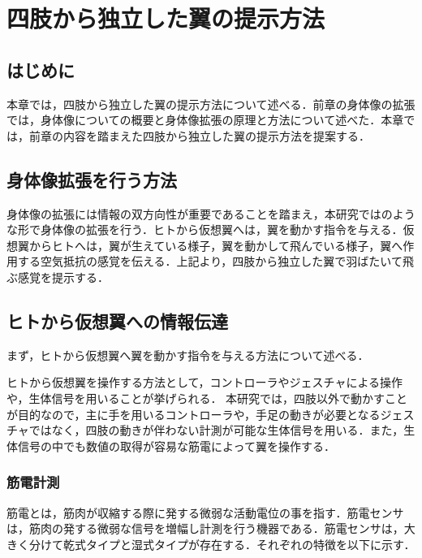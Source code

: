 \chapter[四肢から独立した翼の提示方法]%
        {四肢から独立した翼の提示方法}

\section{はじめに}
    本章では，四肢から独立した翼の提示方法について述べる．前章の身体像の拡張では，身体像についての概要と身体像拡張の原理と方法について述べた．本章では，前章の内容を踏まえた四肢から独立した翼の提示方法を提案する．


\section{身体像拡張を行う方法}
    身体像の拡張には情報の双方向性が重要であることを踏まえ，本研究ではのような形で身体像の拡張を行う．ヒトから仮想翼へは，翼を動かす指令を与える．仮想翼からヒトへは，翼が生えている様子，翼を動かして飛んでいる様子，翼へ作用する空気抵抗の感覚を伝える．上記より，四肢から独立した翼で羽ばたいて飛ぶ感覚を提示する．
    
\section{ヒトから仮想翼への情報伝達}
    まず，ヒトから仮想翼へ翼を動かす指令を与える方法について述べる．

    ヒトから仮想翼を操作する方法として，コントローラやジェスチャによる操作や，生体信号を用いることが挙げられる．
    本研究では，四肢以外で動かすことが目的なので，主に手を用いるコントローラや，手足の動きが必要となるジェスチャではなく，四肢の動きが伴わない計測が可能な生体信号を用いる．また，生体信号の中でも数値の取得が容易な筋電によって翼を操作する．
    
    \subsection{筋電計測}
        筋電とは，筋肉が収縮する際に発する微弱な活動電位の事を指す．筋電センサは，筋肉の発する微弱な信号を増幅し計測を行う機器である\cite{alts-myography}．筋電センサは，大きく分けて乾式タイプと湿式タイプが存在する．それぞれの特徴を以下に示す．

